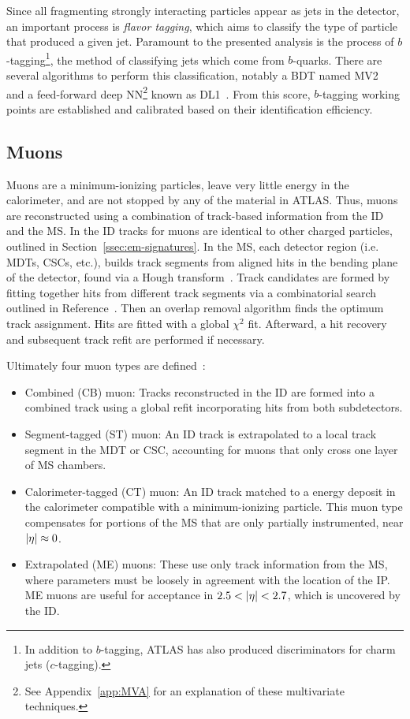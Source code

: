 Since all fragmenting strongly interacting particles appear as jets in the detector, an important process is \textit{flavor tagging}, which aims to classify the type of particle that produced a given jet. Paramount to the presented analysis is the process of $b$-tagging\footnote{In addition to $b$-tagging, ATLAS has also produced discriminators for charm jets ($c$-tagging).}, the method of classifying jets which come from $b$-quarks. There are several algorithms to perform this classification, notably a \gls{BDT} named MV2~\cite{mv2-dl1} and a feed-forward deep \gls{NN}\footnote{See Appendix~\ref{app:MVA} for an explanation of these multivariate techniques.} known as DL1~\cite{mv2-dl1}. From this score, $b$-tagging working points are established and calibrated based on their identification efficiency. 


\subsection{Muons}\label{ssec:muon-reco}

Muons are a minimum-ionizing particles, leave very little energy in the calorimeter, and are not stopped by any of the material in ATLAS. Thus, muons are reconstructed using a combination of track-based information from the \gls{ID} and the \gls{MS}. In the \gls{ID} tracks for muons are identical to other charged particles, outlined in Section~\ref{ssec:em-signatures}. In the \gls{MS}, each detector region (i.e. \glspl{MDT}, \glspl{CSC}, etc.), builds track segments from aligned hits in the bending plane of the detector, found via a Hough transform~\cite{hough-transf}. Track candidates are formed by fitting together hits from different track segments via a combinatorial search outlined in Reference~\cite{muon-reco}. Then an overlap removal algorithm finds the optimum track assignment. Hits are fitted with a global $\chi^2$ fit. Afterward, a hit recovery and subsequent track refit are performed if necessary.

Ultimately four muon types are defined~\cite{muon-reco}:
\begin{itemize}
    \item Combined (CB) muon: Tracks reconstructed in the \gls{ID} are formed into a combined track using a global refit incorporating hits from both subdetectors.
    \item Segment-tagged (ST) muon: An \gls{ID} track is extrapolated to a local track segment in the \gls{MDT} or \gls{CSC}, accounting for muons that only cross one layer of \gls{MS} chambers.
    \item Calorimeter-tagged (CT) muon: An \gls{ID} track matched to a energy deposit in the calorimeter compatible with a minimum-ionizing particle. This muon type compensates for portions of the \gls{MS} that are only partially instrumented, near $|\eta| \approx 0$.
    \item Extrapolated (ME) muons: These use only track information from the \gls{MS}, where parameters must be loosely in agreement with the location of the \gls{IP}. ME muons are useful for acceptance in $2.5 < |\eta| < 2.7$, which is uncovered by the \gls{ID}.
\end{itemize}


